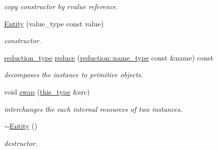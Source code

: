 \begin{DoxyCompactItemize}
\begin{DoxyCompactList}\small\item\em copy constructor by rvalue reference. \end{DoxyCompactList}\item 
\hypertarget{classhryky_1_1http_1_1header_1_1content_1_1length_1_1_entity_ade92d5abed3701b293534404d65ef660}{\hyperlink{classhryky_1_1http_1_1header_1_1content_1_1length_1_1_entity_ade92d5abed3701b293534404d65ef660}{Entity} (value\-\_\-type const value)}\label{classhryky_1_1http_1_1header_1_1content_1_1length_1_1_entity_ade92d5abed3701b293534404d65ef660}

\begin{DoxyCompactList}\small\item\em constructor. \end{DoxyCompactList}\item 
\hypertarget{classhryky_1_1http_1_1header_1_1content_1_1length_1_1_entity_a74934304878affb59593cb60681cd4f5}{\hyperlink{namespacehryky_a343a9a4c36a586be5c2693156200eadc}{reduction\-\_\-type} \hyperlink{classhryky_1_1http_1_1header_1_1content_1_1length_1_1_entity_a74934304878affb59593cb60681cd4f5}{reduce} (\hyperlink{namespacehryky_1_1reduction_ac686c30a4c8d196bbd0f05629a6b921f}{reduction\-::name\-\_\-type} const \&name) const }\label{classhryky_1_1http_1_1header_1_1content_1_1length_1_1_entity_a74934304878affb59593cb60681cd4f5}

\begin{DoxyCompactList}\small\item\em decomposes the instance to primitive objects. \end{DoxyCompactList}\item 
\hypertarget{classhryky_1_1http_1_1header_1_1content_1_1length_1_1_entity_a710957d0ab161730d05d47dd201e4033}{void \hyperlink{classhryky_1_1http_1_1header_1_1content_1_1length_1_1_entity_a710957d0ab161730d05d47dd201e4033}{swap} (\hyperlink{classhryky_1_1http_1_1header_1_1content_1_1length_1_1_entity_aafaa68899d88e773bb1aba75625e397d}{this\-\_\-type} \&src)}\label{classhryky_1_1http_1_1header_1_1content_1_1length_1_1_entity_a710957d0ab161730d05d47dd201e4033}

\begin{DoxyCompactList}\small\item\em interchanges the each internal resources of two instances. \end{DoxyCompactList}\item 
\hypertarget{classhryky_1_1http_1_1header_1_1content_1_1length_1_1_entity_ad853c540e3945c4d327ef79e546ad246}{\hyperlink{classhryky_1_1http_1_1header_1_1content_1_1length_1_1_entity_ad853c540e3945c4d327ef79e546ad246}{$\sim$\-Entity} ()}\label{classhryky_1_1http_1_1header_1_1content_1_1length_1_1_entity_ad853c540e3945c4d327ef79e546ad246}

\begin{DoxyCompactList}\small\item\em destructor. \end{DoxyCompactList}\end{DoxyCompactItemize}

